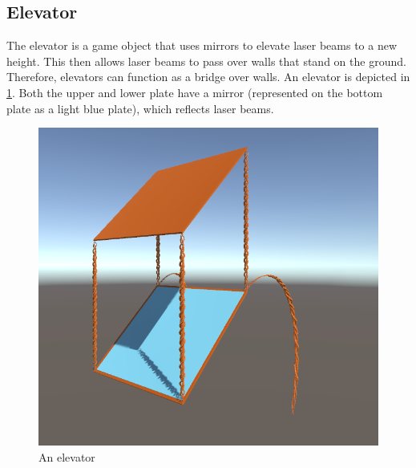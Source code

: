		\subsection{Elevator} \label{ssec:elevator}
			The elevator is a game object that uses mirrors to elevate laser beams
			to a new height. This then allows laser beams to pass over walls that 
			stand on the ground. Therefore, elevators can function as a bridge over
			walls. An elevator is depicted in \ref{fig:elevator}. Both the upper and 
			lower plate have a mirror (represented on the bottom plate as a light 
			blue plate), which reflects laser beams.
			\begin{figure}[!ht]
				\centering
				\includegraphics[scale = 0.3]{Elevator}
				\caption{An elevator}
				\label{fig:elevator}
			\end{figure}
			
